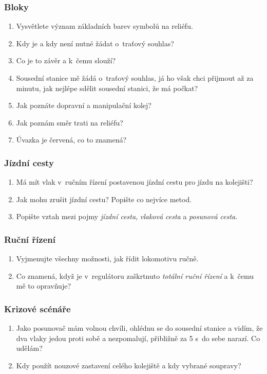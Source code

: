 \documentclass[12pt,a4paper]{article}
\begin{document}
\subsubsection*{Bloky}
\begin{enumerate}[leftmargin=*]
\item Vysvětlete význam základních barev symbolů na reliéfu.
\item Kdy je a kdy není nutné žádat o~traťový souhlas?
\item Co je to závěr a k~čemu slouží?
\item Sousední stanice mě žádá o~traťový souhlas, já ho však chci přijmout až
za minutu, jak nejlépe sdělit sousední stanici, že má počkat?
\item Jak poznáte dopravní a manipulační kolej?
\item Jak poznám směr trati na reliéfu?
\item Úvazka je červená, co to znamená?
\end{enumerate}

\subsubsection*{Jízdní cesty}
\begin{enumerate}[leftmargin=*]
\item Má mít vlak v~ručním řízení postavenou jízdní cestu pro jízdu na
kolejišti?
\item Jak mohu zrušit jízdní cestu? Popište co nejvíce metod.
\item Popište vztah mezi pojmy \textit{jízdní cesta}, \textit{vlaková cesta} a
\textit{posunová cesta}.
\end{enumerate}

\subsubsection*{Ruční řízení}
\begin{enumerate}[leftmargin=*]
\item Vyjmenujte všechny možnosti, jak řídit lokomotivu ručně.
\item Co znamená, když je v~regulátoru zaškrtnuto \textit{totální ruční řízení}
a k~čemu mě to opravňuje?
\end{enumerate}

\subsubsection*{Krizové scénáře}
\begin{enumerate}[leftmargin=*]
\item Jako posunovač mám volnou chvíli, ohlédnu se do sousední stanice a vidím,
že dva vlaky jedou proti sobě a nezpomalují, přibližně za 5 s~do sebe narazí.
Co udělám?
\item Kdy použít nouzové zastavení celého kolejiště a kdy vybrané soupravy?
\end{enumerate}
\end{document}
